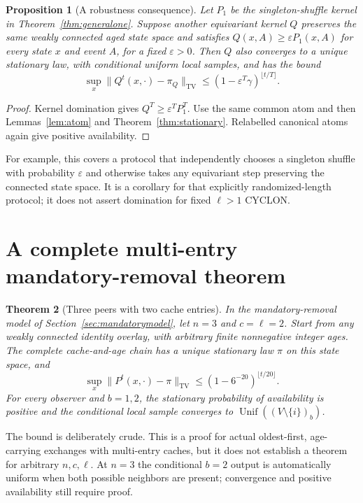 \documentclass[11pt]{article}
\newtheorem{theorem}{Theorem}
\newtheorem{proposition}[theorem]{Proposition}
\newcommand{\TV}{\mathrm{TV}}
\newcommand{\Unif}{\operatorname{Unif}}
\begin{document}
\begin{proposition}[A robustness consequence]
\label{prop:domination}
Let $P_1$ be the singleton-shuffle kernel in
Theorem~\ref{thm:generalone}. Suppose another equivariant
kernel $Q$ preserves the same weakly connected aged state
space and satisfies $Q(x,A)\ge\varepsilon P_1(x,A)$ for every
state $x$ and event $A$, for a fixed $\varepsilon>0$.
Then $Q$ also converges to a unique stationary law, with
conditional uniform local samples, and has the bound
\[
 \sup_x\|Q^t(x,\cdot)-\pi_Q\|_{\TV}
 \le(1-\varepsilon^T\gamma)^{\lfloor t/T\rfloor}.
\]
\end{proposition}
\begin{proof}
Kernel domination gives $Q^T\ge\varepsilon^T P_1^T$.
Use the same common atom and then
Lemmas~\ref{lem:atom} and Theorem~\ref{thm:stationary}.
Relabelled canonical atoms again give positive availability.
\end{proof}

For example, this covers a protocol that independently chooses a
singleton shuffle with probability $\varepsilon$ and otherwise
takes any equivariant step preserving the connected state space.
It is a corollary for that explicitly randomized-length protocol;
it does not assert domination for fixed $\ell>1$ CYCLON.

\section{A complete multi-entry mandatory-removal theorem}
\label{sec:three}

\begin{theorem}[Three peers with two cache entries]
\label{thm:three}
In the mandatory-removal model of Section~\ref{sec:mandatorymodel},
let $n=3$ and $c=\ell=2$. Start from any weakly connected identity
overlay, with arbitrary finite nonnegative integer ages. The complete
cache-and-age chain has a unique stationary law $\pi$ on this state
space, and
\begin{equation}
 \sup_x\|P^t(x,\cdot)-\pi\|_{\TV}
 \le(1-6^{-20})^{\lfloor t/20\rfloor}.
 \label{eq:threebound}
\end{equation}
For every observer and $b=1,2$, the stationary probability of
availability is positive and the conditional local sample converges
to $\Unif((V\setminus\{i\})_b)$.
\end{theorem}

The bound is deliberately crude. This is a proof for actual
oldest-first, age-carrying exchanges with multi-entry caches, but it
does not establish a theorem for arbitrary $n,c,\ell$. At $n=3$ the
conditional $b=2$ output is automatically uniform when both possible
neighbors are present; convergence and positive availability still
require proof.
\end{document}
